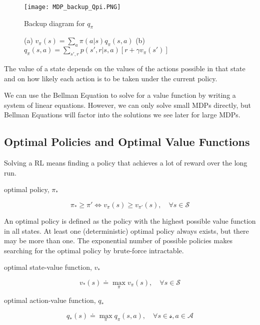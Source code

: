 \documentclass[sutton_barto_notes.tex]{subfiles}
\begin{document}
\begin{figure}[!h]
  \centering
  \texttt{[image: MDP\_backup\_Qpi.PNG]}
  \caption{Backup diagram for $q_\pi$}
  \label{fig:MDP_backup_qpi}
\end{figure}

\begin{figure}[!h]
    \centering
    \caption{ (a) $ v_\pi(s)=\sum_a \pi(a|s)q_\pi(s,a) $ (b) $ q_\pi(s,a)=\sum_{s',r}p(s',r|s,a)[r+\gamma v_\pi(s')] $ }
    \label{fig:MDPMDP}
\end{figure}
The value of a state depends on the values of the actions possible in that state and on how likely each action is to be taken under the current policy.

We can use the Bellman Equation to solve for a value function by writing a system of linear equations. However, we can only solve small MDPs directly, but Bellman Equations will factor into the solutions we see later for large MDPs.

\subsection{Optimal Policies and Optimal Value Functions}

Solving a RL means finding a policy that achieves a lot of reward over the long run.

\begin{definition}
optimal policy, $\pi_*$

$$ \pi_* \geq \pi' \iff v_\pi(s) \geq v_{\pi'}(s), \quad \forall s \in \mathcal{S} $$
\end{definition}
An optimal policy is defined as the policy with the highest possible value function in all states. At least one (deterministic) optimal policy always exists, but there may be more than one. The exponential number of possible policies makes searching for the optimal policy by brute-force intractable.

\begin{definition}
optimal state-value function, $v_*$

$$ v_*(s) \doteq \max_\pi v_\pi(s), \quad \forall s \in \mathcal{S} $$
\end{definition}

\begin{definition}
optimal action-value function, $q_*$

$$ q_*(s) \doteq \max_\pi q_\pi(s,a), \quad \forall s \in \mathcal{s}, a \in \mathcal{A} $$
\end{definition}
\end{document}
